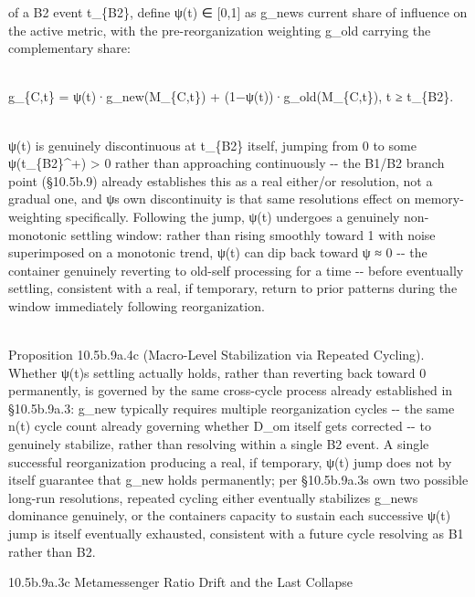 \documentclass[
]{article}
\begin{document}
of a B2 event t\_\{B2\}, define ψ(t) ∈ {[}0,1{]} as
g\_new\textquotesingle s current share of influence on the active
metric, with the pre-reorganization weighting g\_old carrying the
complementary share:\\
\strut \\
g\_\{C,t\} = ψ(t)·g\_new(M\_\{C,t\}) + (1−ψ(t))·g\_old(M\_\{C,t\}), t ≥
t\_\{B2\}.\\
\strut \\
ψ(t) is genuinely discontinuous at t\_\{B2\} itself, jumping from 0 to
some ψ(t\_\{B2\}\^{}+) \textgreater{} 0 rather than approaching
continuously -\/- the B1/B2 branch point (§10.5b.9) already establishes
this as a real either/or resolution, not a gradual one, and
ψ\textquotesingle s own discontinuity is that same
resolution\textquotesingle s effect on memory-weighting specifically.
Following the jump, ψ(t) undergoes a genuinely non-monotonic settling
window: rather than rising smoothly toward 1 with noise superimposed on
a monotonic trend, ψ(t) can dip back toward ψ ≈ 0 -\/- the container
genuinely reverting to old-self processing for a time -\/- before
eventually settling, consistent with a real, if temporary, return to
prior patterns during the window immediately following reorganization.\\
\strut \\
Proposition 10.5b.9a.4c (Macro-Level Stabilization via Repeated
Cycling). Whether ψ(t)\textquotesingle s settling actually holds, rather
than reverting back toward 0 permanently, is governed by the same
cross-cycle process already established in §10.5b.9a.3: g\_new typically
requires multiple reorganization cycles -\/- the same n(t) cycle count
already governing whether D\_om itself gets corrected -\/- to genuinely
stabilize, rather than resolving within a single B2 event. A single
successful reorganization producing a real, if temporary, ψ(t) jump does
not by itself guarantee that g\_new holds permanently; per
§10.5b.9a.3\textquotesingle s own two possible long-run resolutions,
repeated cycling either eventually stabilizes g\_new\textquotesingle s
dominance genuinely, or the container\textquotesingle s capacity to
sustain each successive ψ(t) jump is itself eventually exhausted,
consistent with a future cycle resolving as B1 rather than B2.

10.5b.9a.3c Metamessenger Ratio Drift and the Last Collapse
\end{document}
